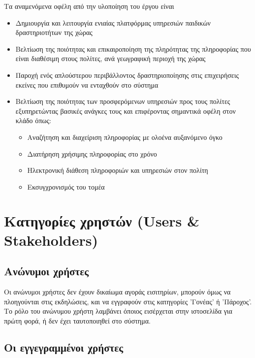 \documentclass[letterpaper,6pt]{article}
\begin{document}
Τα αναμενόμενα οφέλη από την υλοποίηση του έργου είναι
\begin{itemize}
  \item Δημιουργία και λειτουργία ενιαίας πλατφόρμας υπηρεσιών παιδικών δραστηριοτήτων της χώρας
   \item Βελτίωση της ποιότητας και επικαιροποίηση της πληρότητας της πληροφορίας που είναι διαθέσιμη στους πολίτες, ανά γεωγραφική περιοχή της χώρας
   \item Παροχή ενός απλούστερου περιβάλλοντος δραστηριοποίησης στις επιχειρήσεις εκείνες που επιθυμούν να ενταχθούν  στο σύστημα
   \item Βελτίωση της ποιότητας των προσφερόμενων υπηρεσιών προς τους πολίτες εξυπηρετώντας βασικές ανάγκες τους και επιφέροντας σημαντικά οφέλη στον κλάδο όπως: \begin{itemize}
  \item Αναζήτηση και διαχείριση πληροφορίας με ολοένα αυξανόμενο όγκο
    \item Διατήρηση χρήσιμης πληροφορίας στο χρόνο
    \item Ηλεκτρονική διάθεση πληροφοριών και υπηρεσιών στον πολίτη
    \item Εκσυγχρονισμός του τομέα
\end{itemize}
\end{itemize}

\section{Κατηγορίες χρηστών (Users \& Stakeholders)}

    \subsection{Ανώνυμοι χρήστες}
Οι ανώνυμοι χρήστες δεν έχουν δικαίωμα αγοράς εισιτηρίων, μπορούν όμως να πλοηγούνται στις εκδηλώσεις, και να εγγραφούν στις κατηγορίες 'Γονέας' ή 'Πάροχος'. Το ρόλο του ανώνυμου χρήστη λαμβάνει όποιος εισέρχεται στην ιστοσελίδα για πρώτη φορά, ή δεν έχει ταυτοποιηθεί στο σύστημα. 

\subsection{Οι εγγεγραμμένοι χρήστες}
\end{document}
